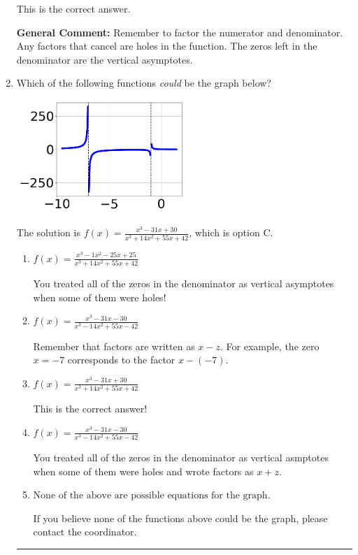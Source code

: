 \documentclass{extbook}[14pt]
\newcommand{\litem}[1]{\item #1

\rule{\textwidth}{0.4pt}}
\begin{document}
\begin{enumerate}
{\begin{enumerate}[label=\Alph*.]
This is the correct answer.
\end{enumerate}

\textbf{General Comment:} Remember to factor the numerator and denominator. Any factors that cancel are holes in the function. The zeros left in the denominator are the vertical asymptotes.
}
\litem{
Which of the following functions \textit{could} be the graph below?

\begin{center}
    \includegraphics[width=0.5\textwidth]{../Figures/identifyGraphOfRationalFunctionCopyB.png}
\end{center}


The solution is \( f(x)=\frac{x^{3} -31 x + 30}{x^{3} +14 x^{2} +55 x + 42} \), which is option C.\begin{enumerate}[label=\Alph*.]
\item \( f(x)=\frac{x^{3} -1 x^{2} -25 x + 25}{x^{3} +14 x^{2} +55 x + 42} \)

You treated all of the zeros in the denominator as vertical asymptotes when some of them were holes!
\item \( f(x)=\frac{x^{3} -31 x -30}{x^{3} -14 x^{2} +55 x -42} \)

Remember that factors are written as $x-z$. For example, the zero $x=-7$ corresponds to the factor $x-(-7)$.
\item \( f(x)=\frac{x^{3} -31 x + 30}{x^{3} +14 x^{2} +55 x + 42} \)

This is the correct answer!
\item \( f(x)=\frac{x^{3} -31 x -30}{x^{3} -14 x^{2} +55 x -42} \)

You treated all of the zeros in the denominator as vertical asmptotes when some of them were holes and wrote factors as $x+z$.
\item \( \text{None of the above are possible equations for the graph.} \)

If you believe none of the functions above could be the graph, please contact the coordinator.
\end{enumerate}

}
\end{enumerate}
\end{document}
